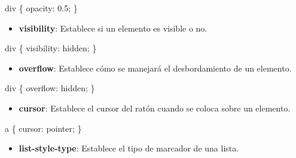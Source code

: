\documentclass[
  a4paper,
  DIV=11,
  numbers=noendperiod,
  onepage,
  openany]{scrreprt}
\newenvironment{Shaded}{\begin{snugshade}}{\end{snugshade}}
\newcommand{\DecValTok}[1]{\textcolor[rgb]{0.68,0.00,0.00}{#1}}
\newcommand{\KeywordTok}[1]{\textcolor[rgb]{0.00,0.23,0.31}{#1}}
\newcommand{\NormalTok}[1]{\textcolor[rgb]{0.00,0.23,0.31}{#1}}
\newcommand{\OperatorTok}[1]{\textcolor[rgb]{0.37,0.37,0.37}{#1}}
\providecommand{\tightlist}{%
  \setlength{\itemsep}{0pt}\setlength{\parskip}{0pt}}\usepackage{longtable,booktabs,array}
\begin{document}
\begin{Shaded}
\begin{Highlighting}[]
\NormalTok{div \{}
  \KeywordTok{opacity}\NormalTok{: }\DecValTok{0.5}\OperatorTok{;}
\NormalTok{\}}
\end{Highlighting}
\end{Shaded}

\begin{itemize}
\tightlist
\item
  \textbf{visibility}: Establece si un elemento es visible o no.
\end{itemize}

\begin{Shaded}
\begin{Highlighting}[]
\NormalTok{div \{}
  \KeywordTok{visibility}\NormalTok{: }\DecValTok{hidden}\OperatorTok{;}
\NormalTok{\}}
\end{Highlighting}
\end{Shaded}

\begin{itemize}
\tightlist
\item
  \textbf{overflow}: Establece cómo se manejará el desbordamiento de un
  elemento.
\end{itemize}

\begin{Shaded}
\begin{Highlighting}[]
\NormalTok{div \{}
  \KeywordTok{overflow}\NormalTok{: }\DecValTok{hidden}\OperatorTok{;}
\NormalTok{\}}
\end{Highlighting}
\end{Shaded}

\begin{itemize}
\tightlist
\item
  \textbf{cursor}: Establece el cursor del ratón cuando se coloca sobre
  un elemento.
\end{itemize}

\begin{Shaded}
\begin{Highlighting}[]
\NormalTok{a \{}
  \KeywordTok{cursor}\NormalTok{: }\DecValTok{pointer}\OperatorTok{;}
\NormalTok{\}}
\end{Highlighting}
\end{Shaded}

\begin{itemize}
\tightlist
\item
  \textbf{list-style-type}: Establece el tipo de marcador de una lista.
\end{itemize}
\end{document}
